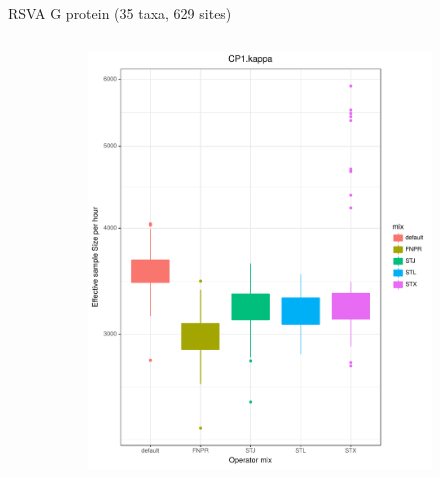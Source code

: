 \documentclass[newPxFont,numfooter,sectionpages]{beamer}
\begin{document}
\begin{frame}{RSVA G protein (35 taxa, 629 sites)}
\begin{figure}
\begin{column}{0.5\textwidth}
    \begin{figure}
     \includegraphics[width=\textwidth]{figures/ESS_hour_CP1Kappa_RSVA.pdf} \\
     \end{figure}
\end{column}
\begin{column}{0.5\textwidth}  %
    \begin{figure}

\end{figure}
\end{column}
\end{figure}
\end{frame}
\end{document}
